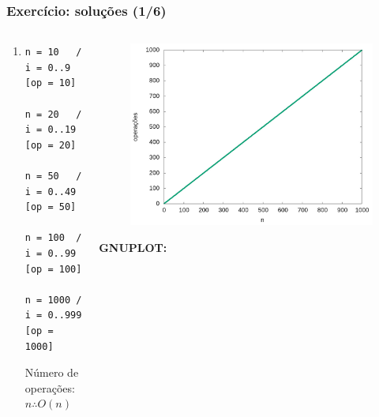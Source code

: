 \documentclass[aspectratio=169]{beamer}
\begin{document}
\begin{frame}[fragile]\frametitle{Exercício: soluções (1/6)}
\begin{columns}[T]
\begin{column}{0.5\linewidth}
\begin{enumerate}
	\setcounter{enumi}{0}
	\item {\scriptsize}
{\tiny
\begin{verbatim}
n = 10   /  i = 0..9    [op = 10]

n = 20   /  i = 0..19   [op = 20]

n = 50   /  i = 0..49   [op = 50]

n = 100  /  i = 0..99   [op = 100]

n = 1000 /  i = 0..999  [op = 1000]
\end{verbatim}
Número de operações: $n \therefore O(n)$
}
\end{enumerate}
\end{column}
\begin{column}{0.5\linewidth}
\begin{figure}[h]
	\centering
		\includegraphics[height=0.5\paperheight]{contagem/contagem01.jpg}
\end{figure}
{\fontsize{0}{4}\selectfont{}\textbf{GNUPLOT:}

}
\end{column}
\end{columns}
\end{frame}
\end{document}
